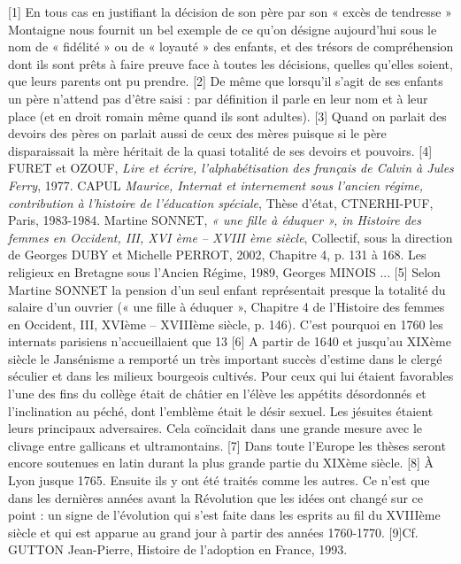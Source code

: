 [1] En tous cas en justifiant la décision de son père par son « excès de tendresse » Montaigne nous fournit un bel exemple de ce qu'on désigne aujourd'hui sous le nom de « fidélité » ou de « loyauté » des enfants, et des trésors de compréhension dont ils sont prêts à faire preuve face à toutes les décisions, quelles qu'elles soient, que leurs parents ont pu prendre. 
[2] De même que lorsqu'il s'agit de ses enfants un père n'attend pas d'être saisi : par définition il parle en leur nom et à leur place (et en droit romain même quand ils sont adultes).
[3] Quand on parlait des devoirs des pères on parlait aussi de ceux des mères puisque si le père disparaissait la mère héritait de la quasi totalité de ses devoirs et pouvoirs.
[4] FURET et OZOUF, \emph{Lire et écrire, l'alphabétisation des français de Calvin à Jules Ferry}, 1977. CAPUL \emph{Maurice, Internat et internement sous l'ancien régime, contribution à l'histoire de l'éducation spéciale}, Thèse d'état, CTNERHI-PUF, Paris, 1983-1984. Martine SONNET, \emph{« une fille à éduquer », in Histoire des femmes en Occident, III, XVI ème – XVIII ème siècle}, Collectif, sous la direction de Georges DUBY et Michelle PERROT, 2002, Chapitre 4, p. 131 à 168. Les religieux en Bretagne sous l'Ancien Régime, 1989, Georges MINOIS ...
[5] Selon Martine SONNET la pension d'un seul enfant représentait presque la totalité du salaire d'un ouvrier (« une fille à éduquer », Chapitre 4 de l'Histoire des femmes en Occident, III, XVIème – XVIIIème siècle, p. 146). C'est pourquoi en 1760 les internats parisiens n'accueillaient que 13 %
[6] A partir de 1640 et jusqu'au XIXème siècle le Jansénisme a remporté un très important succès d'estime dans le clergé séculier et dans les milieux bourgeois cultivés. Pour ceux qui lui étaient favorables l'une des fins du collège était de châtier en l'élève les appétits désordonnés et l'inclination au péché, dont l'emblème était le désir sexuel. Les jésuites étaient leurs principaux adversaires. Cela coïncidait dans une grande mesure avec le clivage entre gallicans et ultramontains. 
[7] Dans toute l'Europe les thèses seront encore soutenues en latin durant la plus grande partie du XIXème siècle.
[8] À Lyon jusque 1765. Ensuite ils y ont été traités comme les autres. Ce n'est que dans les dernières années avant la Révolution que les idées ont changé sur ce point : un signe de l'évolution qui s'est faite dans les esprits au fil du XVIIIème siècle et qui est apparue au grand jour à partir des années 1760-1770.
[9]Cf. GUTTON Jean-Pierre, Histoire de l'adoption en France, 1993.